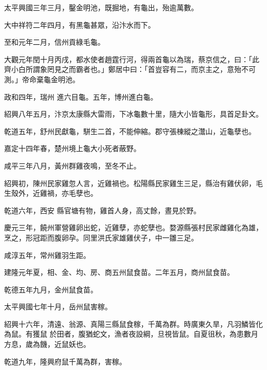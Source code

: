 \begin{pinyinscope}
 太平興國三年三月，鑿金明池，既掘地，有龜出，殆逾萬數。



 大中祥符二年四月，有黑龜甚眾，沿汴水而下。



 至和元年二月，信州貢綠毛龜。



 大觀元年閏十月丙戌，都水使者趙霆行河，得兩首龜以為瑞，蔡京信之，曰：「此齊小白所謂象罔見之而霸者也。」鄭居中曰：「首豈容有二，而京主之，意殆不可測。」帝命棄龜金明池。



 政和四年，瑞州
 進六目龜。五年，博州進白龜。



 紹興八年五月，汴京太康縣大雷雨，下冰龜數十里，隨大小皆龜形，具首足卦文。



 乾道五年，舒州民獻龜，駢生二首，不能伸縮。郡守張棟縱之灊山，近龜孽也。



 嘉定十四年春，楚州境上龜大小死者蔽野。



 咸平三年八月，黃州群雞夜鳴，至冬不止。



 紹興初，陳州民家雞忽人言，近雞禍也。松陽縣民家雞生三足，縣治有雞伏卵，毛生殼外，近雞禍，亦毛孽也。



 乾道六年，西安
 縣官塘有物，雞首人身，高丈餘，晝見於野。



 慶元三年，饒州軍營雞卵出蛇，近雞孽，亦蛇孽也。婺源縣張村民家雌雞化為雄，烹之，形冠距而腹卵孕。同里洪氏家雄雞伏子，中一雛三足。



 咸淳五年，常州雞羽生距。



 建隆元年夏，相、金、均、房、商五州鼠食苗。二年五月，商州鼠食苗。



 乾德五年九月，金州鼠食苗。



 太平興國七年十月，岳州鼠害稼。



 紹興十六年，清遠、翁源、真陽三縣鼠食稼，千萬為群。時廣東久旱，凡羽鱗皆化為鼠。有獲鼠
 於田者，腹猶蛇文，漁者夜設綱，旦視皆鼠。自夏徂秋，為患數月方息，歲為饑，近鼠妖也。



 乾道九年，隆興府鼠千萬為群，害稼。




\end{pinyinscope}
